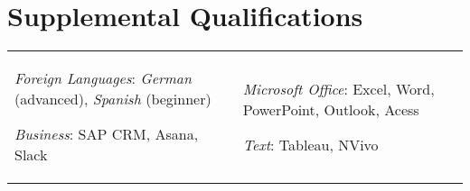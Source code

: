 \documentclass[a4paper,10pt]{article}
\begin{document}
\section{Supplemental Qualifications}
\begin{supertabular}{p{8.65cm} p{8.65cm}}
	\begin{enumerate*}[label =$\circ$, itemjoin={\newline}]
		\item \small \emph{Foreign Languages}: \footnotesize \emph{German} (advanced), \emph{Spanish} (beginner)
	 	\item \small \emph{Business}: \footnotesize SAP CRM, Asana, Slack
	\end{enumerate*}

	& \begin{enumerate*}[label =$\circ$, itemjoin={\newline}]
	 	\item \small \emph{Microsoft Office}: \footnotesize Excel, Word, PowerPoint, Outlook, Acess	
	 	\item \small \emph{Text}: \footnotesize Tableau, NVivo
	\end{enumerate*} \\

\end{supertabular}
\end{document}

